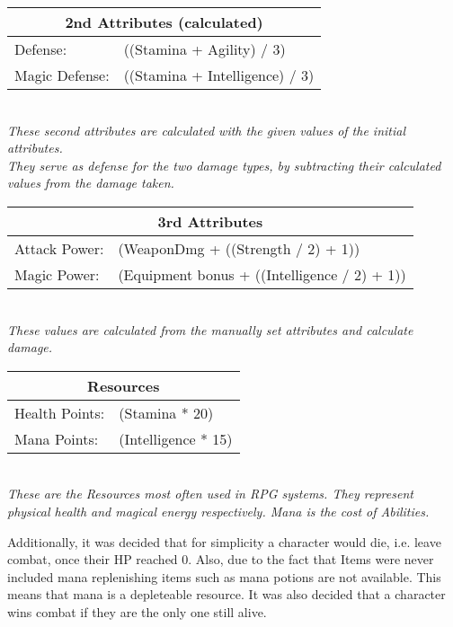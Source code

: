 \begin{center}
\begin{tabular}{|l l|}
\hline
\multicolumn{2}{|c|}{\textbf{2nd Attributes (calculated)}}\\
\hline
Defense: & ((Stamina + Agility) / 3)\\
\hline
Magic Defense: & ((Stamina + Intelligence) / 3)\\
\hline	
\end{tabular}\\
\emph{These second attributes are calculated with the given values of the initial attributes.\\ They serve as defense for the two damage types, by subtracting their calculated values from the damage taken.}
\end{center}

\begin{center}
\begin{tabular}{|l l|}
\hline
\multicolumn{2}{|c|}{\textbf{3rd Attributes}}\\
\hline
Attack Power: & (WeaponDmg + ((Strength / 2) + 1))\\
\hline
Magic Power: & (Equipment bonus + ((Intelligence / 2) + 1))\\
\hline
\end{tabular}\\
\emph{These values are calculated from the manually set attributes and calculate damage.}
\end{center}

\begin{center}
\begin{tabular}{|l l|}
\hline
\multicolumn{2}{|c|}{\textbf{Resources}}\\
\hline
Health Points: & (Stamina * 20)\\
\hline
Mana Points: & (Intelligence * 15)\\
\hline
\end{tabular}\\
\emph{These are the Resources most often used in RPG systems. They represent physical health and magical energy respectively. Mana is the cost of Abilities.}
\end{center}

Additionally, it was decided that for simplicity a character would die, i.e. leave combat, once their HP reached 0. Also, due to the fact that Items were never included mana replenishing items such as mana potions are not available. This means that mana is a depleteable resource. It was also decided that a character wins combat if they are the only one still alive.